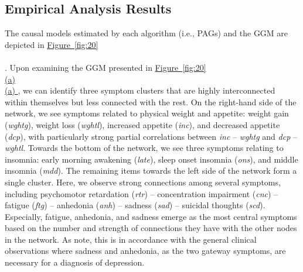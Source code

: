 \documentclass[twoside, 11pt]{article}
\newcommand*{\figref}[2][]{%
  \hyperref[{fig:#2}]{%
    Figure~\ref*{fig:#2}%
    \ifx\\#1\\%
    \else
      #1%
    \fi
  }%
}
\begin{document}





\subsection{Empirical Analysis Results} \label{empiricalresult}
The causal models estimated by each algorithm (i.e., PAGs) and the GGM are depicted in \figref[]{20}. Upon examining the GGM presented in \figref[(a)]{20}, we can identify three symptom clusters that are highly interconnected within themselves but less connected with the rest. On the right-hand side of the network, we see symptoms related to physical weight and appetite: weight gain (\textit{wghtg}), weight loss (\textit{wghtl}), increased appetite (\textit{inc}), and decreased appetite (\textit{dcp}), with particularly strong partial correlations between \textit{inc} -- \textit{wghtg} and \textit{dcp} -- \textit{wghtl}. Towards the bottom of the network, we see three symptoms relating to insomnia: early morning awakening (\textit{late}), sleep onset insomnia (\textit{ons}), and middle insomnia (\textit{mdd}). The remaining items towards the left side of the network form a single cluster. Here, we observe strong connections among several symptoms, including psychomotor retardation (\textit{rtr}) -- concentration impairment (\textit{cnc}) -- fatigue (\textit{ftg}) -- anhedonia (\textit{anh}) -- sadness (\textit{sad}) -- suicidal thoughts (\textit{scd}). Especially, fatigue, anhedonia, and sadness emerge as the most central symptoms based on the number and strength of connections they have with the other nodes in the network. As \cite{mcnally_co-morbid_2017} note, this is in accordance with the general clinical observations where sadness and anhedonia, as the two gateway symptoms, are necessary for a diagnosis of depression. 
\end{document}

